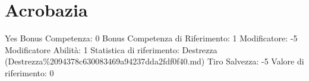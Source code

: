 \section{Acrobazia}\label{acrobazia}

\begin{description}
\tightlist
\item[Tags: ABI]
Yes Bonus Competenza: 0 Bonus Competenza di Riferimento: 1 Modificatore:
-5 Modificatore Abilità: 1 Statistica di riferimento: Destrezza
(Destrezza\%2094378c630083469a94237dda2fdf0f40.md) Tiro Salvezza: -5
Valore di riferimento: 0
\end{description}
